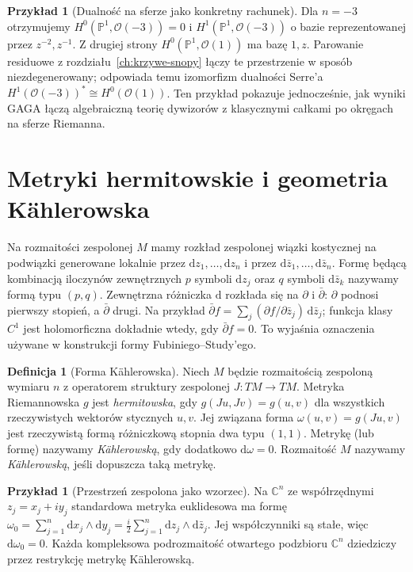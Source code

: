 \documentclass[11pt,a4paper,openany]{report}
\numberwithin{equation}{section}
\theoremstyle{plain}
\theoremstyle{definition}
\newtheorem{definicja}[twierdzenie]{Definicja}
\newtheorem{przyklad}[twierdzenie]{Przykład}
\theoremstyle{remark}
\newcommand{\C}{\mathbb C}
\newcommand{\PP}{\mathbb P}
\begin{document}
\begin{przyklad}[Dualność na sferze jako konkretny rachunek]
Dla $n=-3$ otrzymujemy $H^0(\PP^1,\mathcal O(-3))=0$
i $H^1(\PP^1,\mathcal O(-3))$ o bazie reprezentowanej
przez $z^{-2},z^{-1}$. Z drugiej strony
$H^0(\PP^1,\mathcal O(1))$ ma bazę $1,z$.
Parowanie residuowe z rozdziału~\ref{ch:krzywe-snopy}
łączy te przestrzenie w sposób niezdegenerowany;
odpowiada temu izomorfizm dualności Serre'a
$H^1(\mathcal O(-3))^*\cong H^0(\mathcal O(1))$.
Ten przykład pokazuje jednocześnie, jak wyniki GAGA
łączą algebraiczną teorię dywizorów z klasycznymi
całkami po okręgach na sferze Riemanna.
\end{przyklad}

\section{Metryki hermitowskie i geometria Kählerowska}
\label{sec:ga9-kahler}

Na rozmaitości zespolonej $M$ mamy rozkład zespolonej
wiązki kostycznej na podwiązki generowane lokalnie przez
$\mathrm dz_1,\ldots,\mathrm dz_n$ i przez
$\mathrm d\bar z_1,\ldots,\mathrm d\bar z_n$.
Formę będącą kombinacją iloczynów zewnętrznych $p$ symboli
$\mathrm dz_j$ oraz $q$ symboli $\mathrm d\bar z_k$
nazywamy formą typu $(p,q)$. Zewnętrzna różniczka
$\mathrm d$ rozkłada się na $\partial$ i $\bar\partial$:
$\partial$ podnosi pierwszy stopień, a $\bar\partial$ drugi.
Na przykład $\bar\partial f=\sum_j
(\partial f/\partial\bar z_j)\,\mathrm d\bar z_j$;
funkcja klasy $C^1$ jest holomorficzna dokładnie wtedy,
gdy $\bar\partial f=0$. To wyjaśnia oznaczenia używane
w konstrukcji formy Fubiniego--Study'ego.

\begin{definicja}[Forma Kählerowska]
Niech $M$ będzie rozmaitością zespoloną wymiaru $n$
z operatorem struktury zespolonej $J:TM\to TM$.
Metryka Riemannowska $g$ jest \emph{hermitowska}, gdy
$g(Ju,Jv)=g(u,v)$ dla wszystkich rzeczywistych
wektorów stycznych $u,v$. Jej związana forma
$\omega(u,v)=g(Ju,v)$ jest rzeczywistą formą różniczkową
stopnia dwa typu $(1,1)$. Metrykę (lub formę)
nazywamy \emph{Kählerowską}, gdy dodatkowo
$\mathrm d\omega=0$. Rozmaitość $M$ nazywamy
\emph{Kählerowską}, jeśli dopuszcza taką metrykę.
\end{definicja}

\begin{przyklad}[Przestrzeń zespolona jako wzorzec]
Na $\C^n$ ze współrzędnymi $z_j=x_j+iy_j$
standardowa metryka euklidesowa ma formę
$\omega_0=\sum_{j=1}^n\mathrm dx_j\wedge\mathrm dy_j
=\frac{i}{2}\sum_{j=1}^n\mathrm dz_j\wedge\mathrm d\bar z_j$.
Jej współczynniki są stałe, więc $\mathrm d\omega_0=0$.
Każda kompleksowa podrozmaitość otwartego podzbioru
$\C^n$ dziedziczy przez restrykcję metrykę Kählerowską.
\end{przyklad}
\end{document}
